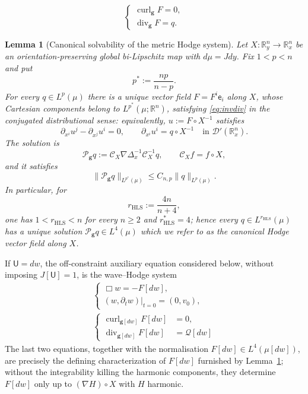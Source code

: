 \documentclass[10pt,a4paper]{amsart}
\newtheorem{lemma}{Lemma}
\DeclareMathOperator{\Div}{div}
\newcommand{\Real}{\mathbb R}
\newcommand{\Rn}{\Real^n}
\newcommand{\Ufield}{\mathsf U}
\DeclareMathOperator{\curl}{curl}
\newcommand{\eframe}{\mathsf e}   %
\newcommand{\gmetric}{\mathbf g}
\begin{document}
\begin{equation}\label{eq:invdiv}
    \begin{cases}
        \curl_{\gmetric}F=0,\\
     \Div_{\gmetric}F=q.
\end{cases}
\end{equation}

\begin{lemma}[Canonical solvability of the metric Hodge system]
\label{lem:hodge-solvability}
Let $X:\Real_y^n\to\Real_x^n$ be an orientation-preserving global
bi-Lipschitz map with $d\mu=J dy$.  Fix $1<p<n$ and put
\[
 p^*:=\frac{np}{n-p}.
\]
For every $q\in L^p(\mu)$ there is a unique vector field $F=F^i\eframe_i$ along $X$, whose Cartesian components belong to
$L^{p^*}(\mu;\Rn)$, satisfying \eqref{eq:invdiv} in the conjugated
distributional sense: equivalently, $u:=F\circ X^{-1}$ satisfies
\[
 \partial_{x^i}u^j-\partial_{x^j}u^i=0,
 \qquad
 \partial_{x^i}u^i=q\circ X^{-1}
 \quad\text{in }\mathcal D'(\Real_x^n).
\]
The solution is
\begin{equation}\label{eq:pressure-gradient}
 \mathcal P_{\gmetric}q
 :=\mathcal C_X\nabla\Delta_x^{-1}\mathcal C_X^{-1}q, \qquad \mathcal{C}_Xf=f\circ X,
\end{equation}
and it satisfies
\begin{equation}\label{eq:canonical-hls}
 \|\mathcal P_{\gmetric}q\|_{L^{p^*}(\mu)}
 \le C_{n,p}\|q\|_{L^p(\mu)}.
\end{equation}
In particular, for
\begin{equation}\label{eq:rHLS}
    r_{\mathrm{HLS}}:=\frac{4n}{n+4},
\end{equation}
one has $1<r_{\mathrm{HLS}}<n$ for every $n\ge2$ and $r_{\mathrm{HLS}}^*=4$; hence
every $q\in L^{r_{\mathrm{HLS}}}(\mu)$ has a unique solution
$\mathcal P_{\gmetric}q\in L^4(\mu)$ which we refer to as the canonical Hodge vector field along $X$.
\end{lemma}

If $\Ufield=dw$, the off-constraint auxiliary equation considered below, without imposing $J[\Ufield]=1$, is
the wave--Hodge system
\begin{subequations}\label{eq:auxiliary-system}
\begin{align}
&
\begin{cases}
    \Box w=-F[dw],\\
    (w,\partial_tw)|_{t=0}=(0,v_0),
\end{cases}\\
 &
 \begin{cases}
  \curl_{\gmetric[dw]}F[dw]&=0,\\
  \Div_{\gmetric[dw]}F[dw]&=\mathcal Q[dw]
 \end{cases}
 &\label{eq:force-hodge}
\end{align}
\end{subequations}
The last two equations, together with the normalisation
$F[dw]\in L^4(\mu[dw])$, are precisely the defining characterization of
$F[dw]$ furnished by Lemma~\ref{lem:hodge-solvability}; without the
integrability killing the harmonic components, they determine $F[dw]$ only up to $(\nabla H)\circ X$ with $H$
harmonic.\\
\end{document}
